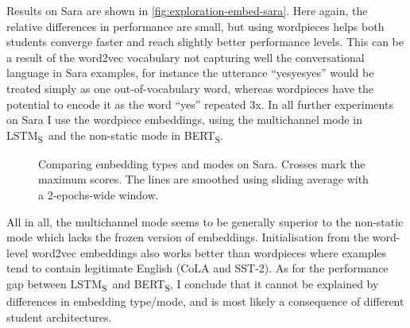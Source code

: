 \documentclass[bsc,frontabs,twoside,singlespacing,parskip,deptreport]{infthesis}
\def\BERTS{BERT\textsubscript{S}}
\def\LSTMS{LSTM\textsubscript{S}}
\def\sliding{The lines are smoothed using sliding average with a 2-epochs-wide window.}
\begin{document}
{{{      Results on Sara are shown in \autoref{fig:exploration-embed-sara}. Here again, the relative differences in performance are small, but using wordpieces helps both students converge faster and reach slightly better performance levels. This can be a result of the word2vec vocabulary not capturing well the conversational language in Sara examples, for instance the utterance ``yesyesyes'' would be treated simply as one out-of-vocabulary word, whereas wordpieces have the potential to encode it as the word ``yes'' repeated 3x. In all further experiments on Sara I use the wordpiece embeddings, using the multichannel mode in \LSTMS~and the non-static mode in \BERTS.

      \begin{figure}[h!t]
        \centering
        \caption{Comparing embedding types and modes on Sara. Crosses mark the maximum scores. \sliding}
        \label{fig:exploration-embed-sara}
      \end{figure}

      All in all, the multichannel mode seems to be generally superior to the non-static mode which lacks the frozen version of embeddings. Initialisation from the word-level word2vec embeddings also works better than wordpieces where examples tend to contain legitimate English (CoLA and SST-2). As for the performance gap between \LSTMS~and \BERTS, I conclude that it cannot be explained by differences in embedding type/mode, and is most likely a consequence of different student architectures.

}}}
\end{document}
